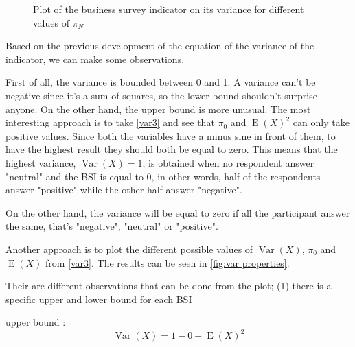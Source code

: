 \documentclass[12pt,a4paper,oneside]{book}
\DeclareMathOperator{\Var}{Var}
\DeclareMathOperator{\E}{E}
\begin{document}
\begin{figure}[hbt!]
    \caption{Plot of the business survey indicator on its variance for different values of $\pi_N$}
    \label{fig:var properties}
\end{figure}


Based on the previous development of the equation of the variance of the indicator, we can make some observations.

First of all, the variance is bounded between 0 and 1. 
A variance can't be negative since it's a sum of squares, so the lower bound shouldn't surprise anyone. On the other hand, the upper bound is more unusual. The most interesting approach is to take  \autoref{var3} and see that $\pi_0$ and $\E(X)^2$ can only take positive values. Since both the variables have a minus sine in front of them, to have the highest result they should both be equal to zero. 
This means that the highest variance, $\Var(X)=1$, is obtained when no respondent answer "neutral" and the BSI is equal to 0, in other words, half of the respondents answer "positive" while the other half answer "negative". 

On the other hand, the variance will be equal to zero if all the participant answer the same, that's "negative", "neutral" or "positive".

Another approach is to plot the different possible values of $\Var(X)$, $\pi_0$ and $\E(X)$ from \autoref{var3}. The results can be seen in \autoref{fig:var properties}.

Their are different observations that can be done from the plot;
(1) there is a specific upper and lower bound for each BSI

upper bound : 
\begin{equation}
    \Var(X) = 1 - 0 - \E(X)^2
\end{equation}
\end{document}
